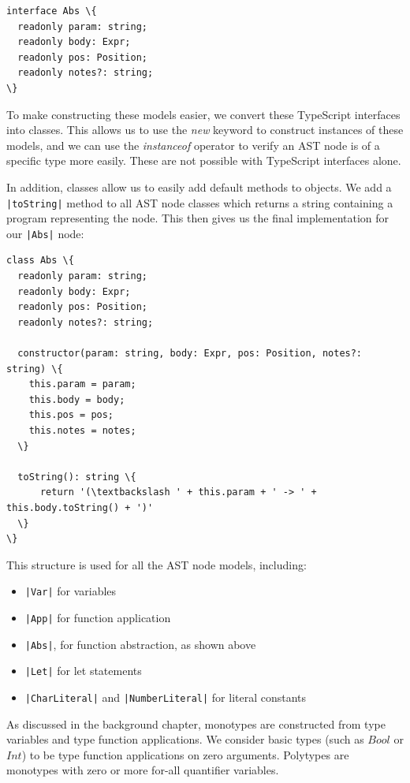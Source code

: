 \documentclass[a4paper,fleqn,12pt]{article}
\begin{document}
\begin{verbatim}
interface Abs \{
  readonly param: string;
  readonly body: Expr;
  readonly pos: Position;
  readonly notes?: string;
\}
\end{verbatim}

To make constructing these models easier, we convert these TypeScript interfaces into classes. This allows us to use the \textit{new} keyword to construct instances of these models, and we can use the \textit{instanceof} operator to verify an AST node is of a specific type more easily. These are not possible with TypeScript interfaces alone.

In addition, classes allow us to easily add default methods to objects. We add a \texttt{|toString|} method to all AST node classes which returns a string containing a program representing the node. This then gives us the final implementation for our \texttt{|Abs|} node:

\begin{verbatim}
class Abs \{
  readonly param: string;
  readonly body: Expr;
  readonly pos: Position;
  readonly notes?: string;

  constructor(param: string, body: Expr, pos: Position, notes?: string) \{
    this.param = param;
    this.body = body;
    this.pos = pos;
    this.notes = notes;
  \}

  toString(): string \{
      return '(\textbackslash ' + this.param + ' -> ' + this.body.toString() + ')'
  \}
\}
\end{verbatim}

This structure is used for all the AST node models, including:
\begin{itemize}
  \item \texttt{|Var|} for variables
  \item \texttt{|App|} for function application
  \item \texttt{|Abs|}, for function abstraction, as shown above
  \item \texttt{|Let|} for let statements
  \item \texttt{|CharLiteral|} and \texttt{|NumberLiteral|} for literal constants
\end{itemize}

\label{id:h.bzdo56ibho4h}
As discussed in the background chapter, monotypes are constructed from type variables and type function applications. We consider basic types (such as $Bool$ or $Int$) to be type function applications on zero arguments. Polytypes are monotypes with zero or more for-all quantifier variables.
\end{document}
